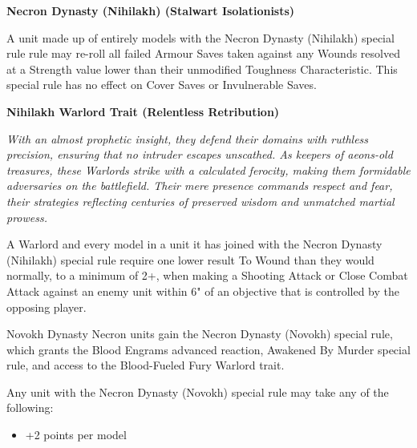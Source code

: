 \begin{multicols}{2}
	\textbf{Necron Dynasty (Nihilakh) (Stalwart Isolationists)}
	
	A unit made up of entirely models with the Necron Dynasty (Nihilakh) special rule rule may re-roll all failed Armour Saves taken against any Wounds resolved at a Strength value lower than their unmodified Toughness Characteristic. This special rule has no effect on Cover Saves or Invulnerable Saves.
	
	\textbf{Nihilakh Warlord Trait (Relentless Retribution)}
	
	\textit{With an almost prophetic insight, they defend their domains with ruthless precision, ensuring that no intruder escapes unscathed. As keepers of aeons-old treasures, these Warlords strike with a calculated ferocity, making them formidable adversaries on the battlefield. Their mere presence commands respect and fear, their strategies reflecting centuries of preserved wisdom and unmatched martial prowess.}
	
	A Warlord and every model in a unit it has joined with the Necron Dynasty (Nihilakh) special rule require one lower result To Wound than they would normally, to a minimum of 2+, when making a Shooting Attack or Close Combat Attack against an enemy unit within 6" of an objective that is controlled by the opposing player.
	
\end{multicols}



\newpage
{}

Novokh Dynasty Necron units gain the Necron Dynasty (Novokh) special rule, which grants the Blood Engrams advanced reaction, Awakened By Murder special rule, and access to the Blood-Fueled Fury Warlord trait.

Any unit with the Necron Dynasty (Novokh) special rule may take any of the following:
\begin{itemize}
	\item {} \dotfill +2 points per model
\end{itemize}

